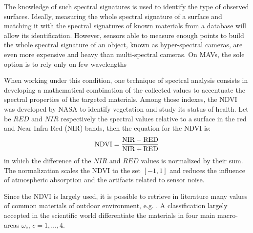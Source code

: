 \documentclass[letterpaper, 10pt, conference]{ieeeconf}      %
\newcommand{\paolo}[1]{{\textcolor{red}{#1}}}
\begin{document}

The knowledge of such spectral signatures is used to identify the type of observed surfaces.
Ideally, measuring the whole spectral signature of a surface and matching it with the spectral signatures of known materials from a database  will allow its identification.
However, sensors able to measure enough points to build the whole spectral signature of an object, known as hyper-spectral cameras, are even more expensive and heavy than multi-spectral cameras.
On MAVs, the sole option is to rely only  on few wavelengths 


When working under this condition, one technique of spectral analysis consists in developing a mathematical combination of the collected values to accentuate the spectral properties of the targeted materials.
Among those indexes, the NDVI  was developed by NASA to identify vegetation and study its status of health.
Let be $RED$ and $NIR$ respectively the spectral values relative to a surface in the red and Near Infra Red (NIR) bands, then the equation for the NDVI is:  
%
\begin{equation} \label{eq:ndvi}
\rm NDVI=\frac{NIR-RED}{NIR+RED}
\end{equation}
%
in which the difference of the $NIR$ and $RED$ values is normalized by their sum.
The normalization scales the NDVI to the set $[-1,1]$ and reduces the influence of atmospheric absorption and  the artifacts related to sensor noise.

Since the NDVI is largely used, it is possible to retrieve in literature many values of common materials of outdoor environment, e.g. \cite{2008_PocPar}.
A classification largely accepted in the scientific world differentiate the materials in four main macro-areas $\omega_c, \, c=1, \ldots, 4$.%
\end{document}

